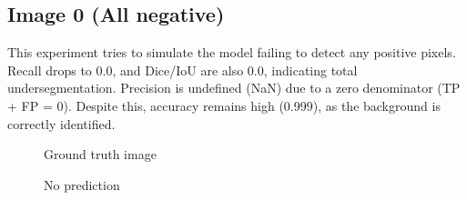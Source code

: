 \documentclass[openany, 12pt]{article}
\begin{document}
\subsection*{Image 0 (All negative)}
This experiment tries to simulate the model failing to detect any positive pixels. Recall drops to 0.0, and Dice/IoU are also 0.0, indicating total undersegmentation. Precision is undefined (NaN) due to a zero denominator (TP + FP = 0). Despite this, accuracy remains high (0.999), as the background is correctly identified.
\begin{figure}[htbp]
	\centering
	\begin{minipage}{0.47\textwidth}
		\centering
		\caption{Ground truth image}
	\end{minipage}
	\hspace{0.01\textwidth}
	\begin{minipage}{0.47\textwidth}
		\centering
		\caption{No prediction}
	\end{minipage}
\end{figure}
\end{document}
